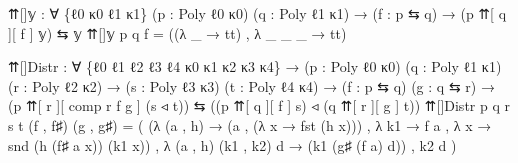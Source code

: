 \documentclass[
  11pt,
  oneside,
  article]{memoir}
\newenvironment{Shaded}{}{}
\newcommand{\NormalTok}[1]{#1}
\newcommand{\OtherTok}[1]{\textcolor[rgb]{0.00,0.44,0.13}{#1}}
\theoremstyle{definition}
\theoremstyle{plain}
\newcommand{\0}{\textsf{0}}
\newcommand{\1}{\tn{\textsf{1}}}
\begin{document}
\begin{Shaded}
\begin{Highlighting}[]
\NormalTok{⇈[]𝕪 }\OtherTok{:} \OtherTok{∀} \OtherTok{\{}\NormalTok{ℓ0 κ0 ℓ1 κ1}\OtherTok{\}} \OtherTok{(}\NormalTok{p }\OtherTok{:}\NormalTok{ Poly ℓ0 κ0}\OtherTok{)} \OtherTok{(}\NormalTok{q }\OtherTok{:}\NormalTok{ Poly ℓ1 κ1}\OtherTok{)} 
       \OtherTok{→} \OtherTok{(}\NormalTok{f }\OtherTok{:}\NormalTok{ p ⇆ q}\OtherTok{)} \OtherTok{→} \OtherTok{(}\NormalTok{p ⇈[ q ][ f ] 𝕪}\OtherTok{)}\NormalTok{ ⇆ 𝕪}
\NormalTok{⇈[]𝕪 p q f }\OtherTok{=} \OtherTok{((λ} \OtherTok{\_} \OtherTok{→}\NormalTok{ tt}\OtherTok{)}\NormalTok{ , }\OtherTok{λ} \OtherTok{\_} \OtherTok{\_} \OtherTok{\_} \OtherTok{→}\NormalTok{ tt}\OtherTok{)}
      

\NormalTok{⇈[]Distr }\OtherTok{:} \OtherTok{∀} \OtherTok{\{}\NormalTok{ℓ0 ℓ1 ℓ2 ℓ3 ℓ4 κ0 κ1 κ2 κ3 κ4}\OtherTok{\}}
           \OtherTok{→} \OtherTok{(}\NormalTok{p }\OtherTok{:}\NormalTok{ Poly ℓ0 κ0}\OtherTok{)} \OtherTok{(}\NormalTok{q }\OtherTok{:}\NormalTok{ Poly ℓ1 κ1}\OtherTok{)} \OtherTok{(}\NormalTok{r }\OtherTok{:}\NormalTok{ Poly ℓ2 κ2}\OtherTok{)}
           \OtherTok{→} \OtherTok{(}\NormalTok{s }\OtherTok{:}\NormalTok{ Poly ℓ3 κ3}\OtherTok{)} \OtherTok{(}\NormalTok{t }\OtherTok{:}\NormalTok{ Poly ℓ4 κ4}\OtherTok{)}
           \OtherTok{→} \OtherTok{(}\NormalTok{f }\OtherTok{:}\NormalTok{ p ⇆ q}\OtherTok{)} \OtherTok{(}\NormalTok{g }\OtherTok{:}\NormalTok{ q ⇆ r}\OtherTok{)}
           \OtherTok{→} \OtherTok{(}\NormalTok{p ⇈[ r ][ comp r f g ] }\OtherTok{(}\NormalTok{s ◃ t}\OtherTok{))} 
\NormalTok{             ⇆ }\OtherTok{((}\NormalTok{p ⇈[ q ][ f ] s}\OtherTok{)}\NormalTok{ ◃ }\OtherTok{(}\NormalTok{q ⇈[ r ][ g ] t}\OtherTok{))}
\NormalTok{⇈[]Distr p q r s t }\OtherTok{(}\NormalTok{f , f♯}\OtherTok{)} \OtherTok{(}\NormalTok{g , g♯}\OtherTok{)} \OtherTok{=} 
    \OtherTok{(} \OtherTok{(λ} \OtherTok{(}\NormalTok{a , h}\OtherTok{)} \OtherTok{→} \OtherTok{(}\NormalTok{a , }\OtherTok{(λ}\NormalTok{ x }\OtherTok{→}\NormalTok{ fst }\OtherTok{(}\NormalTok{h x}\OtherTok{)))}\NormalTok{ , }\OtherTok{λ}\NormalTok{ k1 }\OtherTok{→}\NormalTok{ f a , }\OtherTok{λ}\NormalTok{ x }\OtherTok{→}\NormalTok{ snd }\OtherTok{(}\NormalTok{h }\OtherTok{(}\NormalTok{f♯ a x}\OtherTok{))} \OtherTok{(}\NormalTok{k1 x}\OtherTok{))} 
\NormalTok{    , }\OtherTok{λ} \OtherTok{(}\NormalTok{a , h}\OtherTok{)} \OtherTok{(}\NormalTok{k1 , k2}\OtherTok{)}\NormalTok{ d }\OtherTok{→} \OtherTok{(}\NormalTok{k1 }\OtherTok{(}\NormalTok{g♯ }\OtherTok{(}\NormalTok{f a}\OtherTok{)}\NormalTok{ d}\OtherTok{))}\NormalTok{ , k2 d }\OtherTok{)}
\end{Highlighting}
\end{Shaded}
\end{document}
